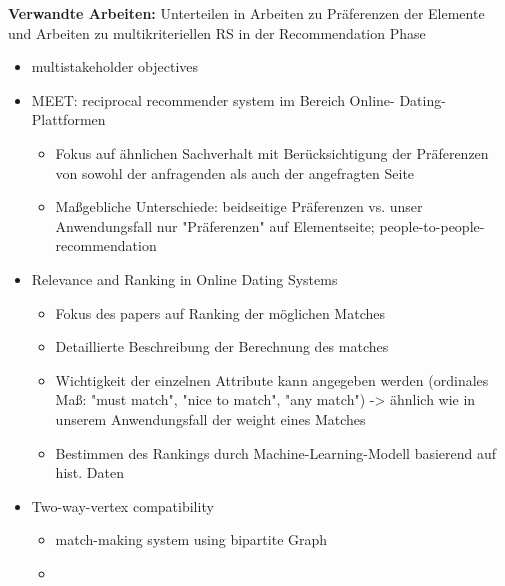 \textbf{Verwandte Arbeiten:}
Unterteilen in Arbeiten zu Präferenzen der Elemente und Arbeiten zu multikriteriellen RS in der Recommendation Phase
\begin{itemize}
    \item multistakeholder objectives %
    \item MEET: reciprocal recommender system im Bereich Online- Dating- Plattformen %
    \begin{itemize}
        \item Fokus auf ähnlichen Sachverhalt mit Berücksichtigung der Präferenzen von sowohl der anfragenden als auch der angefragten Seite
        \item Maßgebliche Unterschiede: beidseitige Präferenzen vs. unser Anwendungsfall nur "Präferenzen" auf Elementseite; people-to-people-recommendation
    \end{itemize}
    \item Relevance and Ranking in Online Dating Systems %
    \begin{itemize}
        \item Fokus des papers auf Ranking der möglichen Matches
        \item Detaillierte Beschreibung der Berechnung des matches
        \item Wichtigkeit der einzelnen Attribute kann angegeben werden (ordinales Maß: "must match", "nice to match", "any match") -> ähnlich wie in unserem Anwendungsfall der weight eines Matches
        \item Bestimmen des Rankings durch Machine-Learning-Modell basierend auf hist. Daten
    \end{itemize}
    \item Two-way-vertex compatibility %
    \begin{itemize}
        \item match-making system using bipartite Graph
        \item 
    \end{itemize}

\end{itemize}
